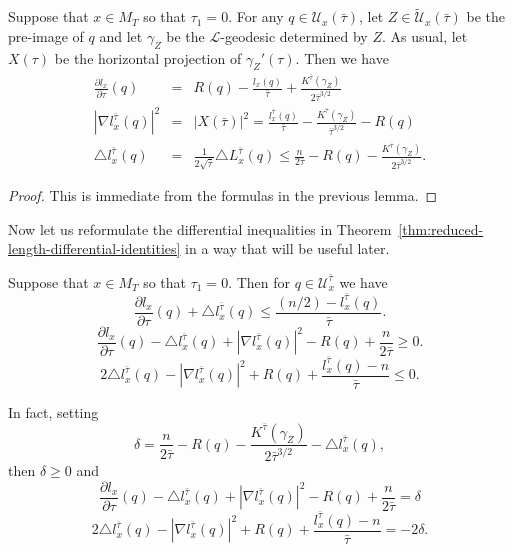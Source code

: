 \begin{theorem}[Reduced length differential identities at $\tau_1=0$]\label{thm:reduced-length-differential-identities}
\label{Ueqn}

Suppose that $x\in M_T$ so that $\tau_1=0$. For any $q\in{\mathcal
U}_x(\bar\tau)$, let $Z\in \widetilde{\mathcal U}_x(\bar\tau)$ be
the pre-image of $q$ and let $\gamma_Z$ be the ${\mathcal
L}$-geodesic determined by $Z$. As usual, let $X(\tau)$ be the
horizontal projection of $\gamma_Z'(\tau)$. Then we have
\begin{eqnarray*} \frac{\partial l_x}{\partial \tau}(q) & = &
R(q)-\frac{l_x(q)}{\bar\tau}+\frac{K^{\bar\tau}(\gamma_Z)}{2\bar\tau^{3/2}}
\\
|\nabla l_x^{\bar\tau}(q)|^2 & = & |X(\bar\tau)|^2  =
\frac{l_x^{\bar\tau}(q)}{\bar\tau}-\frac{K^{\bar\tau}
(\gamma_Z)}{\bar\tau^{3/2}}-R(q)  \\
\triangle l_x^{\bar\tau}(q) & = &
\frac{1}{2\sqrt{\bar\tau}}\triangle L_x^{\bar\tau}(q)\le \frac{n}{2
\bar\tau}-R(q)-\frac{K^{\bar\tau}(\gamma_Z)}{2\bar\tau^{3/2}}.
\end{eqnarray*}
\end{theorem}

\begin{proof}
\sketch
{}
This is immediate from the formulas in the previous lemma.
\end{proof}

Now let us reformulate the differential inequalities in
Theorem~\ref{thm:reduced-length-differential-identities} in a way that will be useful later.

\begin{corollary}\label{cor:reduced-length-pde-inequalities}
\label{lformula}

Suppose that $x\in M_T$ so that $\tau_1=0$. Then for $q\in{\mathcal
U}^{\bar\tau}_x$ we have
$$\frac{\partial l_x}{\partial \tau}(q)+\triangle l_x^{\bar\tau}(q)\le \frac{(n/2)-l_x^{\bar\tau}(q)}{\bar\tau}.$$
$$\frac{\partial l_x}{\partial \tau}(q)-\triangle l_x^{\bar\tau}(q)+|\nabla l_x^{\bar\tau}(q)|^2-R(q)+\frac{n}{2\bar\tau}\ge 0 .$$
$$2\triangle l_x^{\bar\tau}(q)-|\nabla l_x^{\bar\tau}(q)|^2+R(q)+\frac{l_x^{\bar\tau}(q)-n}{\bar\tau}
\le 0.$$

In fact, setting $$\delta=\frac{n}{2
\bar\tau}-R(q)-\frac{K^{\bar\tau}(\gamma_Z)}{2\bar\tau^{3/2}}-\triangle
l_x^{\bar\tau}(q),$$ then $\delta\ge 0$ and
$$\frac{\partial l_x}{\partial \tau}(q)-\triangle l_x^{\bar\tau}(q)
+|\nabla l_x^{\bar\tau}(q)|^2-R(q)+\frac{n}{2\bar\tau}=\delta$$
$$2\triangle l_x^{\bar\tau}(q)-|\nabla l_x^{\bar\tau}(q)|^2+R(q)
+\frac{l_x^{\bar\tau}(q)-n}{\bar\tau}=-2\delta.$$
\end{corollary}

